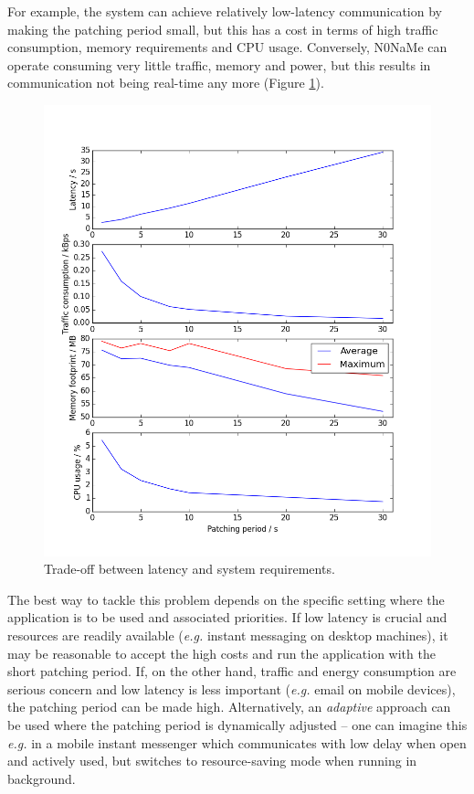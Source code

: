 \documentclass[a4paper, twoside, 12pt]{report}
\newcommand{\funkytt}{\fontfamily{AnonymousPro}\selectfont}
\begin{document}
For example, the system can achieve relatively low-latency communication by making the patching period small, but this has a cost in terms of high traffic consumption, memory requirements and CPU usage. Conversely, {\funkytt N0NaMe} can operate consuming very little traffic, memory and power, but this results in communication not being real-time any more (Figure \ref{fig:key_tradeoff}). 

\begin{figure}[H]
    \captionsetup{width=0.9\textwidth}
    \centering
    \includegraphics[width=0.7\linewidth]{pics/eval/key_tradeoff.png}
    \caption{\label{fig:key_tradeoff} Trade-off between latency and system requirements.}
\end{figure}


The best way to tackle this problem depends on the specific setting where the application is to be used and associated priorities. If low latency is crucial and resources are readily available (\textit{e.g.} instant messaging on desktop machines), it may be reasonable to accept the high costs and run the application with the short patching period. If, on the other hand, traffic and energy consumption are serious concern and low latency is less important (\textit{e.g.} email on mobile devices), the patching period can be made high. Alternatively, an \emph{adaptive} approach can be used where the patching period is dynamically adjusted -- one can imagine this \emph{e.g.} in a mobile instant messenger which communicates with low delay when open and actively used, but switches to resource-saving mode when running in background.
\end{document}
